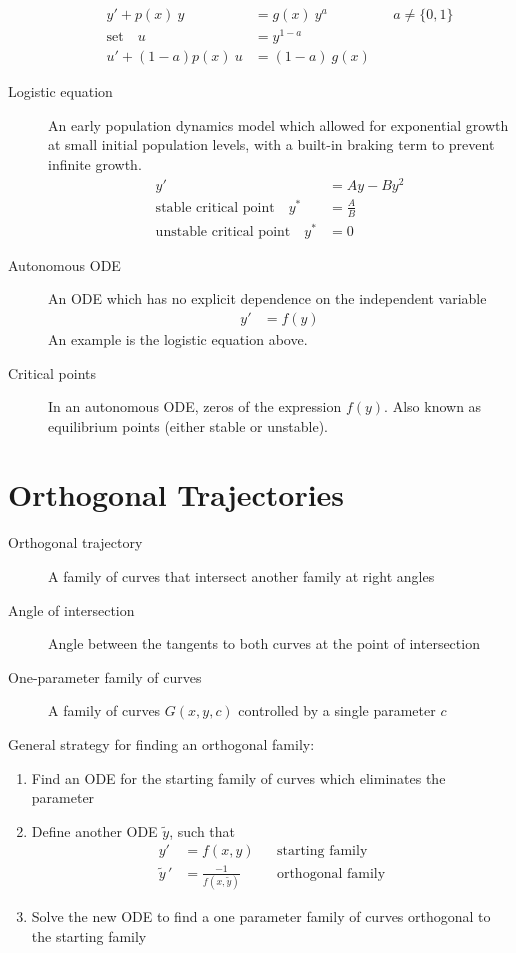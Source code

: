 \begin{description}
\begin{align}
            y' + p(x)\ y       & = g(x)\ y^{a} &  & a \neq \{ 0, 1\} \\
            \text{set} \quad u & = y^{1-a}                           \\
            u' + (1-a)p(x)\ u  & = (1-a)\ g(x)
        \end{align}
    \item[Logistic equation] An early population dynamics model which allowed for exponential
        growth at small initial population levels, with a built-in braking term to prevent infinite
        growth.
        \begin{align}
            y'                                         & = Ay - By^{2} \\
            \text{stable critical point} \quad y^{*}   & = \frac{A}{B} \\
            \text{unstable critical point} \quad y^{*} & = 0
        \end{align}
    \item[Autonomous ODE] An ODE which has no explicit dependence on the independent variable
        \begin{align}
            y' & = f(y)
        \end{align}
        An example is the logistic equation above.
    \item[Critical points] In an autonomous ODE, zeros of the expression $ f(y) $. Also known
    as equilibrium points (either stable or unstable).
\end{description}

\section{Orthogonal Trajectories}

\begin{description}
    \item[Orthogonal trajectory] A family of curves that intersect another family at right angles
    \item[Angle of intersection] Angle between the tangents to both curves at the point of intersection
    \item[One-parameter family of curves] A family of curves $ G(x, y, c) $ controlled by a single parameter $ c $
\end{description}
General strategy for finding an orthogonal family:
\begin{enumerate}
    \item Find an ODE for the starting family of curves which eliminates the parameter
    \item Define another ODE $ \tilde{y} $, such that
          \begin{align}
              y'           & = f(x, y)                    &  & \text{starting family}   \\
              \tilde{y}\,' & = \frac{-1}{f(x, \tilde{y})} &  & \text{orthogonal family}
          \end{align}
    \item Solve the new ODE to find a one parameter family of curves orthogonal to the starting family
\end{enumerate}

